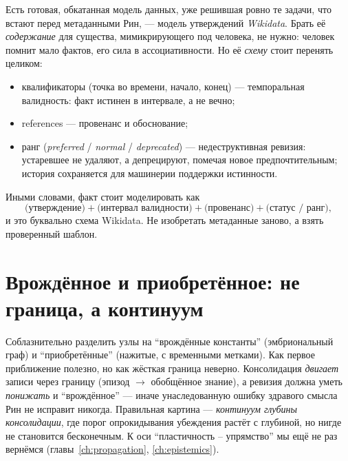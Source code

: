 Есть готовая, обкатанная модель данных, уже решившая ровно те задачи, что
встают перед метаданными Рин, --- модель утверждений \emph{Wikidata}. Брать
её \emph{содержание} для существа, мимикрирующего под человека, не нужно:
человек помнит мало фактов, его сила в ассоциативности. Но её \emph{схему}
стоит перенять целиком:

\begin{itemize}
\item квалификаторы (точка во времени, начало, конец) --- темпоральная
валидность: факт истинен в интервале, а не вечно;
\item references --- провенанс и обоснование;
\item ранг (\emph{preferred} / \emph{normal} / \emph{deprecated}) ---
недеструктивная ревизия: устаревшее не удаляют, а депрецируют, помечая новое
предпочтительным; история сохраняется для машинерии поддержки истинности.
\end{itemize}

Иными словами, факт стоит моделировать как
\[
\text{(утверждение)} + \text{(интервал валидности)} +
\text{(провенанс)} + \text{(статус / ранг)},
\]
и это буквально схема Wikidata. Не изобретать метаданные заново, а взять
проверенный шаблон.

\section{Врождённое и приобретённое: не граница, а континуум}

Соблазнительно разделить узлы на ``врождённые константы'' (эмбриональный
граф) и ``приобретённые'' (нажитые, с временными метками). Как первое
приближение полезно, но как жёсткая граница неверно. Консолидация
\emph{двигает} записи через границу (эпизод $\to$ обобщённое знание), а
ревизия должна уметь \emph{понижать} и ``врождённое'' --- иначе унаследованную
ошибку здравого смысла Рин не исправит никогда. Правильная картина ---
\emph{континуум глубины консолидации}, где порог опрокидывания убеждения
растёт с глубиной, но нигде не становится бесконечным. К оси
``пластичность -- упрямство'' мы ещё не раз вернёмся
(главы~\ref{ch:propagation}, \ref{ch:epistemics}).
